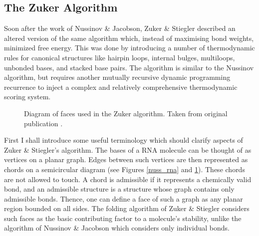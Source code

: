 \documentclass[12pt, a4paper]{article}
\begin{document}
\subsection{The Zuker Algorithm}
Soon after the work of Nussinov \& Jacobson, Zuker \& Stiegler \cite{zuker1981optimal}
described an altered version of the same algorithm which, instead of maximising
bond weights, minimized free energy. This was done
by introducing a number of thermodynamic rules for canonical structures like hairpin loops, internal bulges, multiloops, unbonded bases, and stacked base pairs. The algorithm is similar to the Nussinov algorithm,
but requires another mutually recursive dynamic programming recurrence to inject a complex and relatively comprehensive thermodynamic scoring system.


\begin{figure}
\begin{center}
\end{center}
\caption{Diagram of faces used in the Zuker algorithm. Taken from original
publication \cite{zuker1981optimal}.}
\label{zuk_struct}
\end{figure}

First I shall introduce some useful terminology which should clarify aspects of Zuker \& Stiegler’s
algorithm. The bases of a RNA molecule can be thought of as vertices on a planar graph. Edges between such vertices are then represented as chords on a semicircular diagram (see Figures \ref{nuss_rna} and \ref{zuk_struct}). These chords are not allowed to touch. A chord
is admissible if it represents a chemically valid bond, and an
admissible structure is a structure whose graph contains only admissible bonds. Thence, one can define a face of such a graph as any planar region bounded on all sides. The folding algorithm of Zuker \& Stiegler considers such faces as the basic contributing factor to a molecule's stability, unlike the algorithm of Nussinov \& Jacobson
which considers only individual bonds.
\end{document}
